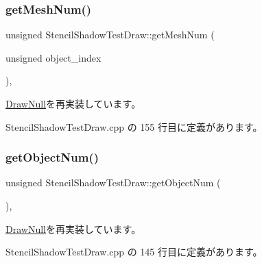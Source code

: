 \subsubsection{\texorpdfstring{get\+Mesh\+Num()}{getMeshNum()}}
{\footnotesize\ttfamily unsigned Stencil\+Shadow\+Test\+Draw\+::get\+Mesh\+Num (\begin{DoxyParamCaption}\item[{unsigned}]{object\+\_\+index }\end{DoxyParamCaption})\hspace{0.3cm}{\ttfamily [override]}, {\ttfamily [virtual]}}



\mbox{\hyperlink{class_draw_null_a7586cc78eed6bcaf2972ad7a6a70e665}{Draw\+Null}}を再実装しています。



 Stencil\+Shadow\+Test\+Draw.\+cpp の 155 行目に定義があります。

\mbox{\label{class_stencil_shadow_test_draw_ad93f1c8a60a701d185108896c58dd578}} 
\subsubsection{\texorpdfstring{get\+Object\+Num()}{getObjectNum()}}
{\footnotesize\ttfamily unsigned Stencil\+Shadow\+Test\+Draw\+::get\+Object\+Num (\begin{DoxyParamCaption}{ }\end{DoxyParamCaption})\hspace{0.3cm}{\ttfamily [override]}, {\ttfamily [virtual]}}



\mbox{\hyperlink{class_draw_null_ae71c0b03f98748a4eb1d2e2635bcc146}{Draw\+Null}}を再実装しています。



 Stencil\+Shadow\+Test\+Draw.\+cpp の 145 行目に定義があります。

\mbox{\label{class_stencil_shadow_test_draw_a58f3699fa7ced20625edca807698aa85}} 
